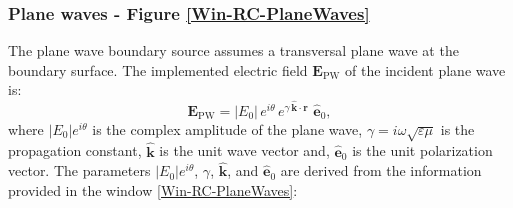 \subsubsection{Plane waves - Figure \ref{Win-RC-PlaneWaves}}\label{bsPlaneWave}

The plane wave boundary source assumes a transversal plane wave at the boundary surface. The implemented electric field $\mathbf{E}_{\text{PW}}$ of the incident plane wave is:
\begin{equation}\label{EPW}
	\mathbf{E}_{\text{PW}} = |E_{0}|\,e^{i\theta}\,e^{\gamma\,\mathbf{\hat{k}}\cdot\mathbf{r}}\,\,\mathbf{\hat{e}}_{0},
\end{equation}
where $|E_{0}|e^{i\theta}$ is the complex amplitude of the plane wave, $\gamma = i\omega\sqrt{\varepsilon\mu}$ is the propagation constant, $\mathbf{\hat{k}}$ is the unit wave vector and, $\mathbf{\hat{e}}_{0}$ is the unit polarization vector. The parameters $|E_{0}|e^{i\theta}$, $\gamma$, $\mathbf{\hat{k}}$, and $\mathbf{\hat{e}}_{0}$ are derived from the information provided in the window \ref{Win-RC-PlaneWaves}:
